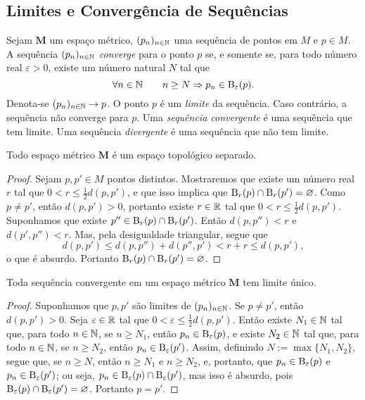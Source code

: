 \subsection{Limites e Convergência de Sequências}

\begin{defi}
Sejam $\bm M$ um espaço métrico, $(p_n)_{n \in \mathbb{N}}$ uma sequência de pontos em $M$ e $p \in M$. A sequência $(p_n)_{n \in \mathbb{N}}$  \emph{converge} para o ponto $p$ se, e somente se, para todo número real $\varepsilon > 0$, existe um número natural $N$ tal que
	\begin{equation*}
	\forall n \in \mathbb{N} \qquad n \geq N \Rightarrow p_n \in \mathrm{B}_\varepsilon(p).
	\end{equation*}
Denota-se $(p_n)_{n \in \mathbb{N}} \rightarrow p$. O ponto $p$ é um \emph{limite} da sequência.  Caso contrário, a sequência não converge para $p$. Uma \emph{sequência convergente} é uma sequência que tem limite. Uma sequência \emph{divergente} é uma sequência que não tem limite.
\end{defi}

\begin{prop}
Todo espaço métrico $\bm M$ é um espaço topológico separado.
\end{prop}
\begin{proof}
Sejam $p,p' \in M$ pontos distintos. Mostraremos que existe um número real $r$ tal que $0 < r \leq \frac{1}{2} d(p,p')$, e que isso implica que $\mathrm{B}_r(p) \cap \mathrm{B}_r(p') = \varnothing$. Como $p \neq p'$, então $d(p,p') > 0$, portanto existe $r \in \mathbb{R}$ tal que $0 < r \leq \frac{1}{2} d(p,p')$. Suponhamos que existe $p'' \in \mathrm{B}_r(p) \cap \mathrm{B}_r(p')$. Então $d(p,p'')<r$ e $d(p',p'')<r$. Mas, pela desigualdade triangular, segue que
	\begin{equation*}
	d(p,p') \leq d(p,p'') + d(p'',p') < r + r \leq d(p,p'),
	\end{equation*}
o que é absurdo. Portanto $\mathrm{B}_r(p) \cap \mathrm{B}_r(p') = \varnothing$.
\end{proof}

\begin{coro}
Toda sequência convergente em um espaço métrico $\bm M$ tem limite único.
\end{coro}
\begin{proof}
Suponhamos que $p,p'$ são limites de $(p_n)_{n \in \mathbb{N}}$. Se $p \neq p'$, então $d(p,p')>0$. Seja $\varepsilon \in \mathbb{R}$ tal que $0 < \varepsilon \leq \frac{1}{2} d(p,p')$. Então existe $N_1 \in \mathbb{N}$ tal que, para todo $n \in \mathbb{N}$, se $n \geq N_1$, então $p_n \in \mathrm{B}_\varepsilon(p)$, e existe $N_2 \in \mathbb{N}$ tal que, para todo $n \in \mathbb{N}$, se $n \geq N_2$, então $p_n \in \mathrm{B}_\varepsilon(p')$. Assim, definindo $N := \max \{N_1,N_2\}$, segue que, se $n \geq N$, então $n \geq N_1$ e $n \geq N_2$, e, portanto, que $p_n \in \mathrm{B}_\varepsilon(p)$ e $p_n \in \mathrm{B}_\varepsilon(p')$; ou seja, $p_n \in \mathrm{B}_\varepsilon(p) \cap \mathrm{B}_\varepsilon(p')$, mas isso é absurdo, pois $\mathrm{B}_\varepsilon(p) \cap \mathrm{B}_\varepsilon(p')=\varnothing$. Portanto $p=p'$.
\end{proof}

